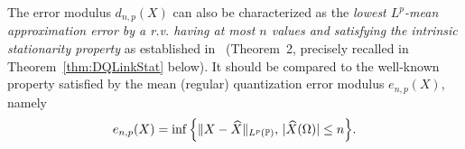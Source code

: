 The error modulus  $d_{n,p}(X)$ can also be characterized as  the {\em lowest $L^p$-mean
approximation error by a r.v.  having at most $n$ values and satisfying the
intrinsic stationarity property} as established in~\cite{dualStat} (Theorem~2, precisely recalled in Theorem~\ref{thm:DQLinkStat} below). 
It should be compared to the well-known property satisfied by the mean (regular) quantization error modulus $e_{n,p}(X)$, namely
\[ 
e_{n,p}(X) = \inf\Big\{\|X-\widehat
X\|_{L^p(\mathbb{P})},\, |\widehat X( \Omega)|\le n\Big\}. 
\]


